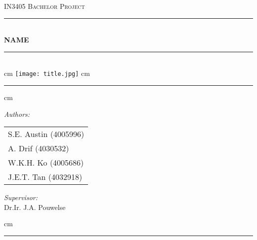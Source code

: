 \documentclass[a4paper]{report}
\begin{document}
\begin{titlepage}
			\begin{center}
			\textsc{\LARGE {IN3405 Bachelor Project}}\\[1cm]
			\rule{\linewidth}{0.5mm} \\[0.4cm]

			{\Huge \bfseries NAME}\\[0.15cm]

			\rule{\linewidth}{0.5mm} \\[1.5cm]
			
			 cm
			\texttt{[image: title.jpg]}
			 cm
				\rule{\linewidth}{0.5mm}
			
			 cm
			
			\begin{minipage}{0.4\textwidth}
				\begin{flushleft} \large
					\emph{Authors:}\\
					\begin{tabular}{l}
						S.E. Austin (4005996) \\
						A. Drif (4030532) \\
						W.K.H. Ko (4005686) \\
						J.E.T. Tan (4032918)
					\end{tabular}
				\end{flushleft}
			\end{minipage}
			\hspace{1cm}
			\begin{minipage}{0.4\textwidth}
				\begin{flushright} \large
					\emph{Supervisor:} \\
					Dr.Ir. J.A. Pouwelse
				\end{flushright}
			\end{minipage}
			
			 cm
			
			\rule{\linewidth}{0.5mm}
			\end{center}
\end{titlepage}



\tableofcontents








\end{document}

